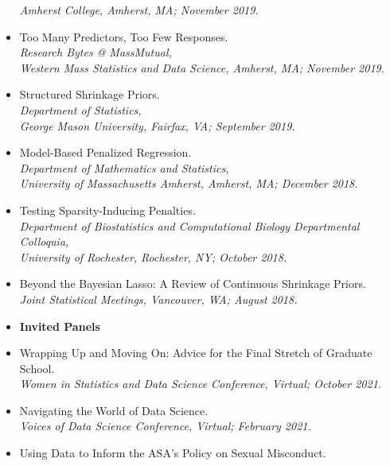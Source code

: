 \documentclass[11pt]{article}
\newcommand{\tab}{\hspace*{2em}}
\begin{document}
\begin{itemize}
	\tab \emph{Amherst College, Amherst, MA; November 2019.} \vspace{-2mm}
	\item[] Too Many Predictors, Too Few Responses. \\
	\tab \emph{Research Bytes @ MassMutual,}\\ 
	\tab \emph{Western Mass Statistics and Data Science, Amherst, MA; November 2019.} \vspace{-2mm}
	\item[] Structured Shrinkage Priors. \\
	\tab \emph{Department of Statistics,}\\ 
	\tab \emph{George Mason University, Fairfax, VA; September 2019.} \vspace{-2mm}
	\item[] Model-Based Penalized Regression. \\
	\tab \emph{Department of Mathematics and Statistics,}\\ 
	\tab \emph{University of Massachusetts Amherst, Amherst, MA; December 2018.} \vspace{-2mm}
	\item[] Testing Sparsity-Inducing Penalties. \\
	\tab \emph{Department of Biostatistics and Computational Biology Departmental Colloquia,}\\ 
	\tab \emph{University of Rochester, Rochester, NY; October 2018.} \vspace{-2mm}
	\item[] Beyond the Bayesian Lasso: A Review of Continuous Shrinkage Priors. \\
	\tab \emph{Joint Statistical Meetings, Vancouver, WA; August 2018.} \vspace{-2mm}
	\item[] \textbf{Invited Panels} \vspace{-2mm}
	\item[] Wrapping Up and Moving On: Advice for the Final Stretch of Graduate School. \\
	\tab \emph{Women in Statistics and Data Science Conference, Virtual; October 2021.} \vspace{-2mm}
	\item[] Navigating the World of Data Science. \\
	\tab \emph{Voices of Data Science Conference, Virtual; February 2021.} \vspace{-2mm}
	\item[] Using Data to Inform the ASA's Policy on Sexual Misconduct. \\

\end{itemize}
\end{document}
